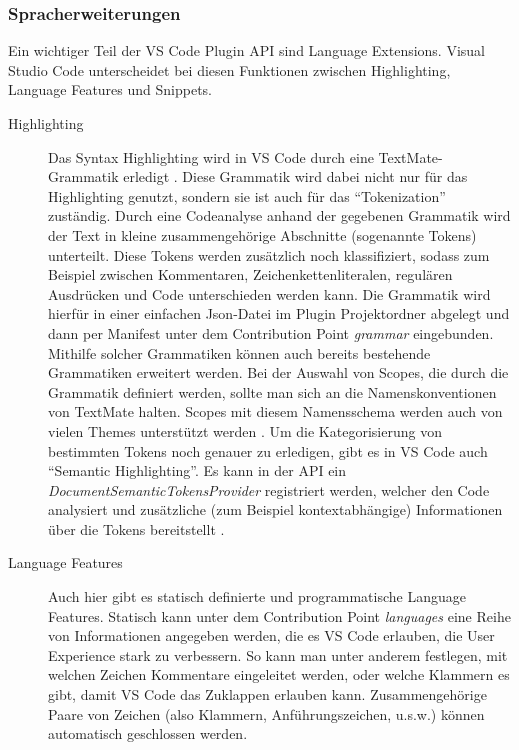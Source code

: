 \subsubsection{Spracherweiterungen}
  Ein wichtiger Teil der VS Code Plugin API sind Language Extensions. Visual Studio Code unterscheidet
  bei diesen Funktionen zwischen Highlighting, Language Features und Snippets.
  \begin{description}
    \item[Highlighting] 
      Das Syntax Highlighting wird in VS Code durch eine TextMate-\linebreak
      Grammatik erledigt \cite{TextMateGrammar}.
      Diese Grammatik wird dabei nicht nur für das Highlighting genutzt, sondern sie ist auch für das \enquote{Tokenization}
      zuständig. Durch eine Codeanalyse anhand der gegebenen Grammatik wird der Text in kleine 
      zusammengehörige Abschnitte (sogenannte Tokens) unterteilt. Diese Tokens werden zusätzlich noch 
      klassifiziert, sodass zum Beispiel zwischen Kommentaren, Zeichenkettenliteralen, regulären Ausdrücken und Code unterschieden werden kann.
      Die Grammatik wird hierfür in einer einfachen Json-Datei im Plugin Projektordner abgelegt und dann per Manifest
      unter dem Contribution Point \emph{grammar} eingebunden. Mithilfe solcher Grammatiken können auch bereits bestehende
      Grammatiken erweitert werden. Bei der Auswahl von Scopes, die durch die Grammatik definiert werden, sollte man sich
      an die Namenskonventionen von TextMate halten. Scopes mit diesem Namensschema werden auch von vielen Themes unterstützt werden
      \cite{VSCodeExtensionAPISyntaxHighlightGuide}.
      Um die Kategorisierung von bestimmten Tokens noch genauer zu erledigen, gibt es in VS Code auch \enquote{Semantic Highlighting}. 
      Es kann in der API ein \emph{DocumentSemanticTokensProvider} registriert werden,
      welcher den Code analysiert und zusätzliche (zum Beispiel kontextabhängige) Informationen über die Tokens bereitstellt
      \cite{VSCodeExtensionAPISemanticHighlightGuide}.
    \item[Language Features] 
      Auch hier gibt es statisch definierte und programmatische Language Features.
      Statisch kann unter dem Contribution Point \emph{languages} eine Reihe von Informationen angegeben werden,
      die es VS Code erlauben, die User Experience stark zu verbessern. So kann man unter anderem festlegen,
      mit welchen Zeichen Kommentare eingeleitet werden, oder welche Klammern es gibt, damit VS Code das Zuklappen erlauben kann.
      Zusammengehörige Paare von Zeichen (also Klammern, Anführungszeichen, u.s.w.) können automatisch geschlossen werden.

\end{description}
